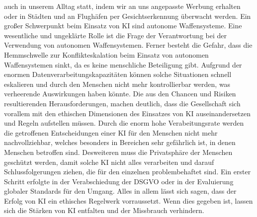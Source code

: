 auch in unserem Alltag statt, indem wir an uns angepasste Werbung erhalten oder in Städten und an Flughäfen per Gesichtserkennung überwacht werden.
Ein großer Schwerpunkt beim Einsatz von \ac{KI} sind autonome Waffensysteme. Eine wesentliche und ungeklärte Rolle ist die Frage der Verantwortung bei der Verwendung von autonomen Waffensystemen. Ferner besteht die Gefahr, dass die Hemmschwelle zur Konflikteskalation beim Einsatz von autonomen Waffensystemen sinkt, da es keine menschliche Beteiligung gibt.
Aufgrund der enormen Datenverarbeitungskapazitäten können solche Situationen schnell eskalieren und durch den Menschen nicht mehr kontrollierbar werden, was verheerende
Auswirkungen haben könnte.
Die aus den Chancen und Risiken resultierenden Herausforderungen, machen deutlich, dass die Gesellschaft sich vorallem mit den ethischen Dimensionen des Einsatzes von \ac{KI} auseinandersetzen und Regeln aufstellen müssen.
Durch die enorm hohe Verabeitungsrate werden die getroffenen Entscheidungen einer \ac{KI} für den Menschen nicht mehr nachvollziehbar, welches besonders in Bereichen sehr gefährlich ist, in denen
Menschen betroffen sind. 
Desweiteren muss die Privatsphäre der Menschen geschützt werden, damit solche \ac{KI} nicht alles verarbeiten und darauf Schlussfolgerungen ziehen, die für den einzelnen problembehaftet sind. Ein erster
Schritt erfolgte in der Verabschiedung der \ac{DSGVO} oder in der Evaluierung globaler Standards für den Umgang.
Alles in allem lässt sich sagen, dass der Erfolg von \ac{KI} ein ethisches Regelwerk vorraussetzt. Wenn dies gegeben ist, lassen sich die Stärken von \ac{KI} entfalten und der Missbrauch
verhindern. 